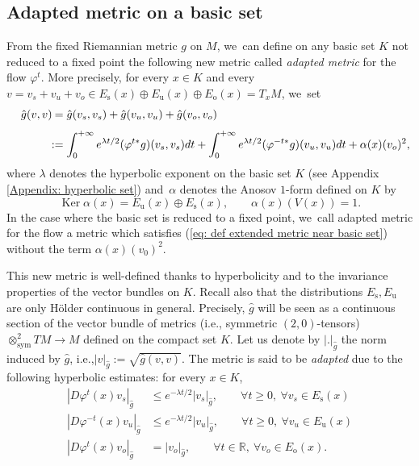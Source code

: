 \documentclass[11pt]{article}
\newcommand{\ie}{i.e.,\xspace}
\newcommand{\ro}{\mathrm{o}}
\newcommand{\rs}{\mathrm{s}}
\newcommand{\ru}{\mathrm{u}}
\newcommand{\sym}{\mathrm{sym}}
\theoremstyle{definition}
\theoremstyle{plain}
\newcommand{\R}{\mathbb{R}}
\DeclareMathOperator{\Ker}{Ker}
\begin{document}
\subsection{Adapted metric on a basic set}\label{subsubsection adapted metric}

From the fixed Riemannian metric $g$ on $M$, we~can define on any basic set $K$ not reduced to a fixed point the following new metric called \emph{adapted metric} for the flow $\varphi^t$. More precisely, for every $x \in K$ and every $v = v_s + v_u + v_o \in E_\rs (x) \oplus E_\ru (x) \oplus E_\ro (x) = T_x M$, we~set
\begin{align}\label{eq: def extended metric near basic set}
\quad\hat{g} (v,v) \!\!&\hphantom{:}= \hat{g}(v_s, v_s) + \hat{g}(v_u, v_u) + \hat{g}(v_o, v_o) \notag\\[-1pt]\\[-10pt]\notag
&:= \int_0^{+\infty} e^{\lambda t /2} (\varphi^{t*} g) (v_s,v_s) dt + \int_0^{+\infty} e^{\lambda t /2} (\varphi^{-t*} g) (v_u,v_u) dt + \alpha(x) (v_o)^2,
\end{align}
where $\lambda$ denotes the hyperbolic exponent on the basic set $K$ (see Appendix \ref{Appendix: hyperbolic set}) and~$\alpha$ denotes the Anosov $1$-form defined on $K$ by
\[
\Ker \alpha (x) = E_\ru (x) \oplus E_\rs (x), \qquad \alpha (x) (V(x)) = 1.
\]
In the case where the basic set is reduced to a fixed point, we~call adapted metric for the flow a metric which satisfies (\ref{eq: def extended metric near basic set}) without the term $\alpha (x) (v_0)^2$.

This new metric is well-defined thanks to hyperbolicity and to the invariance properties of the vector bundles on $K$. Recall also that the distributions $E_\rs, E_\ru$ are only Hölder continuous in general. Precisely, $\hat{g}$ will be seen as a continuous section of the vector bundle of metrics (\ie symmetric $(2,0)$-tensors) $\otimes_{\sym}^2 T M \to M$ defined on the compact set $K$. Let us denote by $|.|_{\hat{g}}$ the norm induced by $\hat{g}$, \ie $|v|_{\hat{g}}:= \sqrt{\hat{g}(v,v)}$. The metric is said to be \textit{adapted} due to the following hyperbolic estimates: for every $x \in K$,
\begin{equation}\label{hyperbolic estimates for the adapted metric}
\begin{split}
|D\varphi^t (x) v_s |_{\hat{g}} &\leq e^{-\lambda t /2} |v_s |_{\hat{g}}, \qquad \forall t \geq 0, \: \forall v_s \in E_\rs (x) \\
|D\varphi^{-t} (x) v_u |_{\hat{g}} &\leq e^{-\lambda t /2} |v_u |_{\hat{g}}, \qquad \forall t \geq 0, \: \forall v_u \in E_\ru (x) \\
|D\varphi^t (x) v_o |_{\hat{g}} &= |v_o |_{\hat{g}}, \qquad \forall t \in \R, \:\forall v_o \in E_\ro (x).
\end{split}
\end{equation}
\end{document}
